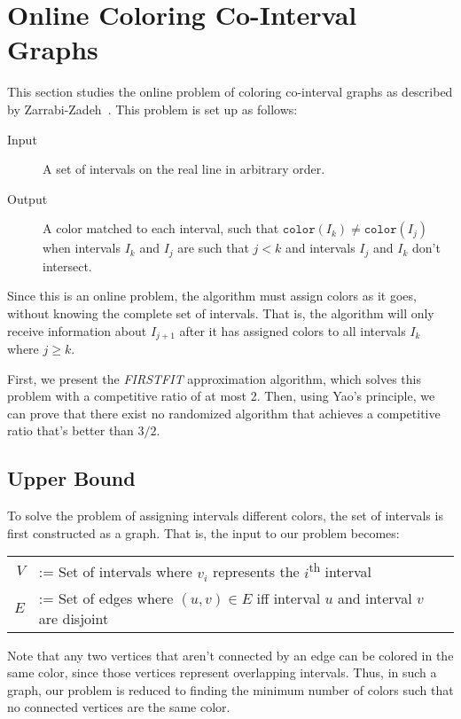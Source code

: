 \section{Online Coloring Co-Interval Graphs}
This section studies the online problem of coloring co-interval graphs as described by \hbox{Zarrabi-Zadeh}~\cite{zarrabi}.
This problem is set up as follows:

\begin{description}
	\item[Input] A set of intervals on the real line in arbitrary order.
	\item[Output] A color matched to each interval, such that $\texttt{color}(I_k) \neq \texttt{color}(I_j)$ when intervals $I_k$ and $I_j$ are such that $j < k$ and intervals $I_j$ and $I_k$ don't intersect.
\end{description}

Since this is an online problem, the algorithm must assign colors as it goes, without knowing the complete set of intervals. That is, the algorithm will only receive information about $I_{j+1}$ after it has assigned colors to all intervals $I_k$ where $j \geq k$.

First, we present the \emph{FIRSTFIT} approximation algorithm, which solves this problem with a competitive ratio of at most 2. Then, using Yao's principle, we can prove that there exist no randomized algorithm that achieves a competitive ratio that's better than $3/2$.

\subsection{Upper Bound}
To solve the problem of assigning intervals different colors, the set of intervals is first constructed as a graph. That is, the input to our problem becomes:

\begin{center}
	\begin{tabular}{rl}
		$V$ &:= Set of intervals where $v_i$ represents the $i$\textsuperscript{th} interval \\
		$E$ &:= Set of edges where $(u,v) \in E$ iff interval $u$ and interval $v$ are disjoint
	\end{tabular}
\end{center}

Note that any two vertices that aren't connected by an edge can be colored in the same color, since those vertices represent overlapping intervals. Thus, in such a graph, our problem is reduced to finding the minimum number of colors such that no connected vertices are the same color.

